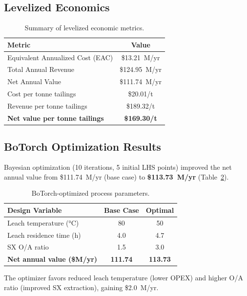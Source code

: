 \documentclass[11pt,a4paper]{article}
\begin{document}
\subsection{Levelized Economics}

\begin{table}[H]
\centering
\caption{Summary of levelized economic metrics.}
\label{tab:economics}
\begin{tabular}{@{}lc@{}}
\toprule
\textbf{Metric} & \textbf{Value} \\
\midrule
Equivalent Annualized Cost (EAC) & \$13.21~M/yr \\
Total Annual Revenue             & \$124.95~M/yr \\
Net Annual Value                 & \$111.74~M/yr \\
\midrule
Cost per tonne tailings          & \$20.01/t \\
Revenue per tonne tailings       & \$189.32/t \\
\textbf{Net value per tonne tailings} & \textbf{\$169.30/t} \\
\bottomrule
\end{tabular}
\end{table}

\subsection{BoTorch Optimization Results}

Bayesian optimization (10 iterations, 5 initial LHS points) improved
the net annual value from \$111.74~M/yr (base case) to
\textbf{\$113.73~M/yr} (Table~\ref{tab:bo}).

\begin{table}[H]
\centering
\caption{BoTorch-optimized process parameters.}
\label{tab:bo}
\begin{tabular}{@{}lcc@{}}
\toprule
\textbf{Design Variable} & \textbf{Base Case} & \textbf{Optimal} \\
\midrule
Leach temperature (\si{\celsius}) & 80   & 50 \\
Leach residence time (h)          & 4.0  & 4.7 \\
SX O/A ratio                      & 1.5  & 3.0 \\
\midrule
\textbf{Net annual value (\$M/yr)} & \textbf{111.74} & \textbf{113.73} \\
\bottomrule
\end{tabular}
\end{table}

The optimizer favors reduced leach temperature (lower OPEX) and
higher O/A ratio (improved SX extraction), gaining \$2.0~M/yr.
\end{document}
